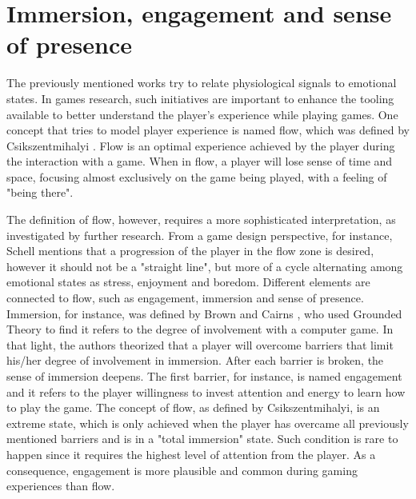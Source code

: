 \section{Immersion, engagement and sense of presence}

The previously mentioned works try to relate physiological signals to emotional states. In games research, such initiatives are important to enhance the tooling available to better understand the player's experience while playing games. One concept that tries to model player experience is named flow, which was defined by Csikszentmihalyi \parencite{csikszentmihalyi1991flow}. Flow is an optimal experience achieved by the player during the interaction with a game. When in flow, a player will lose sense of time and space, focusing almost exclusively on the game being played, with a feeling of "being there".

The definition of flow, however, requires a more sophisticated interpretation, as investigated by further research. From a game design perspective, for instance, Schell \parencite{schell2014art} mentions that a progression of the player in the flow zone is desired, however it should not be a "straight line", but more of a cycle alternating among emotional states as stress, enjoyment and boredom. Different elements are connected to flow, such as engagement, immersion and sense of presence. Immersion, for instance, was defined by Brown and Cairns \parencite{brown2004grounded}, who used Grounded Theory to find it refers to the degree of involvement with a computer game. In that light, the authors theorized that a player will overcome barriers that limit his/her degree of involvement in immersion. After each barrier is broken, the sense of immersion deepens. The first barrier, for instance, is named engagement and it refers to the player willingness  to invest attention and energy to learn how to play the game. The concept of flow, as defined by Csikszentmihalyi, is an extreme state, which is only achieved when the player has overcame all previously mentioned barriers and is in a "total immersion" state. Such condition is rare to happen since it requires the highest level of attention from the player. As a consequence, engagement is more plausible and common during gaming experiences than flow.

